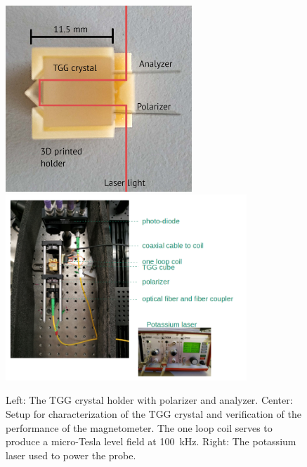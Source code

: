 \begin{refsection}
        \begin{figure}[h]
            \centering
            \includegraphics[height = 7cm]{Figures/muEDM/sensor.jpg}
            \hfill
            \includegraphics[height = 7cm]{Figures/muEDM/setup100kHz.png}
            \caption{Left: The TGG crystal holder with polarizer and analyzer. Center: Setup for characterization of the TGG crystal and verification of the performance of the magnetometer. The one loop coil serves to produce a micro-Tesla level field at \SI{100}{kHz}. Right: The potassium laser used to power the probe.}
        \label{fig:faraday_probe}
        \end{figure}


\end{refsection}
